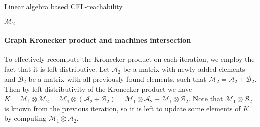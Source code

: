 \begin{algorithm}[h]
\begin{algorithmic}[1]
\footnotesize
\caption{Linear algebra based CFL-reachability}
\label{tensor:cflr}
        


            \EndIf
       \EndFor
    \EndWhile
\State \Return $\mathcal{M}_2$
\EndFunction
\end{algorithmic}
\end{algorithm}


\paragraph*{Graph Kronecker product and machines intersection}

To effectively recompute the Kronecker product on each iteration, we employ the fact that it is left-distributive.
Let $\mathcal{A}_2$ be a matrix with newly added elements and $\mathcal{B}_2$ be a matrix with all previously found elements, such that $\mathcal{M}_2 = \mathcal{A}_2 + \mathcal{B}_2$.
Then by left-distributivity of the Kronecker product we have $K = \mathcal{M}_1 \otimes \mathcal{M}_2 = \mathcal{M}_1 \otimes (\mathcal{A}_2 + \mathcal{B}_2) = \mathcal{M}_1\otimes \mathcal{A}_2 + \mathcal{M}_1 \otimes \mathcal{B}_2$.
Note that $\mathcal{M}_1 \otimes \mathcal{B}_2$ is known from the previous iteration, so it is left to update some elements of $K$ by computing $\mathcal{M}_1\otimes \mathcal{A}_2$.

